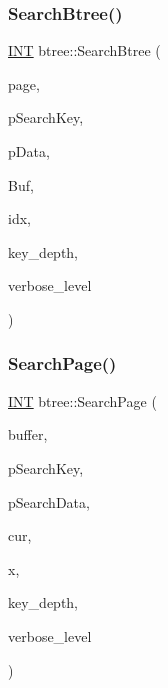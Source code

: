 \mbox{\label{classbtree_a6717768edf4de1aad4736c303bcedddd}} 
\subsubsection{\texorpdfstring{Search\+Btree()}{SearchBtree()}}
{\footnotesize\ttfamily \mbox{\hyperlink{galois_8h_a09fddde158a3a20bd2dcadb609de11dc}{I\+NT}} btree\+::\+Search\+Btree (\begin{DoxyParamCaption}\item[{\mbox{\hyperlink{galois_8h_a09fddde158a3a20bd2dcadb609de11dc}{I\+NT}}}]{page,  }\item[{void $\ast$}]{p\+Search\+Key,  }\item[{\mbox{\hyperlink{discreta_8h_abf512b6b30146dda9c59049478bf3e99}{D\+A\+T\+A\+T\+Y\+PE}} $\ast$}]{p\+Data,  }\item[{\mbox{\hyperlink{discreta_8h_a4966414b761cd8d10ba385fe5e7c07fc}{Buffer}} $\ast$}]{Buf,  }\item[{\mbox{\hyperlink{galois_8h_a09fddde158a3a20bd2dcadb609de11dc}{I\+NT}} $\ast$}]{idx,  }\item[{\mbox{\hyperlink{galois_8h_a09fddde158a3a20bd2dcadb609de11dc}{I\+NT}}}]{key\+\_\+depth,  }\item[{\mbox{\hyperlink{galois_8h_a09fddde158a3a20bd2dcadb609de11dc}{I\+NT}}}]{verbose\+\_\+level }\end{DoxyParamCaption})}

\mbox{\label{classbtree_a36608b9c27c8207ddb8f6b5f706ab439}} 
\subsubsection{\texorpdfstring{Search\+Page()}{SearchPage()}}
{\footnotesize\ttfamily \mbox{\hyperlink{galois_8h_a09fddde158a3a20bd2dcadb609de11dc}{I\+NT}} btree\+::\+Search\+Page (\begin{DoxyParamCaption}\item[{\mbox{\hyperlink{discreta_8h_a4966414b761cd8d10ba385fe5e7c07fc}{Buffer}} $\ast$}]{buffer,  }\item[{void $\ast$}]{p\+Search\+Key,  }\item[{\mbox{\hyperlink{discreta_8h_abf512b6b30146dda9c59049478bf3e99}{D\+A\+T\+A\+T\+Y\+PE}} $\ast$}]{p\+Search\+Data,  }\item[{\mbox{\hyperlink{galois_8h_a09fddde158a3a20bd2dcadb609de11dc}{I\+NT}} $\ast$}]{cur,  }\item[{\mbox{\hyperlink{galois_8h_a09fddde158a3a20bd2dcadb609de11dc}{I\+NT}} $\ast$}]{x,  }\item[{\mbox{\hyperlink{galois_8h_a09fddde158a3a20bd2dcadb609de11dc}{I\+NT}}}]{key\+\_\+depth,  }\item[{\mbox{\hyperlink{galois_8h_a09fddde158a3a20bd2dcadb609de11dc}{I\+NT}}}]{verbose\+\_\+level }\end{DoxyParamCaption})}

